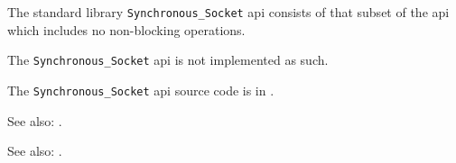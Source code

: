 
The standard library {\tt Synchronous\_Socket} api consists of that subset of the 
 api which includes no non-blocking operations.

The {\tt Synchronous\_Socket} api is not implemented as such.

The {\tt Synchronous\_Socket} api source code is in .

See also:  .

See also:  .

